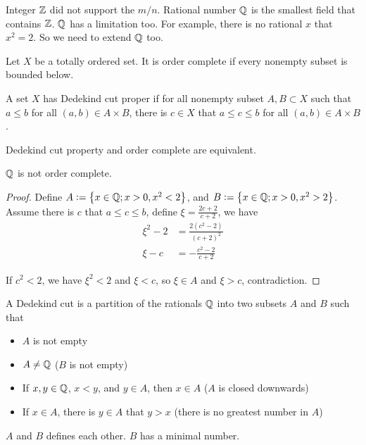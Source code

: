 Integer $\mathbb{Z}$ did not support the $m/n$. Rational number $\mathbb{Q}$ is the smallest field that contains $\mathbb{Z}$. $\mathbb{Q}$ has a limitation too. For example, there is no rational $x$ that $x^2 = 2$. So we need to extend $\mathbb{Q}$ too.

\begin{definition}
    Let $X$ be a totally ordered set. It is order complete if every nonempty subset is bounded below.
\end{definition}

\begin{definition}
    A set $X$ has Dedekind cut proper if for all nonempty subset $A,B \subset X$ such that $a \leq b$ for all $(a,b) \in A \times B$, there is $c \in X$ that $a \leq c \leq b$ for all $(a,b) \in A \times B$.
    
    Dedekind cut property and order complete are equivalent.
\end{definition}

\begin{theorem}
    $\mathbb{Q}$ is not order complete.
\end{theorem}
\begin{proof}
    Define $A:=\set{x \in \mathbb{Q}; x > 0 , x^2 < 2}$, and $B:=\set{x \in \mathbb{Q}; x > 0, x^2 > 2}$. Assume there is $c$ that $a \leq c \leq b$, define $\xi = \frac{2c+2}{c+2}$, we have
    \begin{equation}
        \begin{aligned}
            \xi^2 - 2 &= \frac{2(c^2 -2)}{(c+2)^2} \\
            \xi - c &= - \frac{c^2 -2}{c+2}    
        \end{aligned}        
    \end{equation}
    
    If $c^2 < 2$, we have $\xi^2 < 2$ and $\xi < c$, so $\xi \in A$ and $\xi > c$, contradiction.
\end{proof}

\begin{definition}
    A Dedekind cut is a partition of the rationals $\mathbb{Q}$ into two subsets $A$ and $B$ such that
    \begin{itemize}
        \item $A$ is not empty
        \item $A \neq \mathbb{Q}$ ($B$ is not empty)
        \item If $x,y \in \mathbb{Q}$, $x < y$, and $y \in A$, then $x \in A$ ($A$ is closed downwards)
        \item If $x \in A$, there is $y \in A$ that $y > x$ (there is no greatest number in $A$)
    \end{itemize}
    
    $A$ and $B$ defines each other. $B$ has a minimal number. 
\end{definition}

